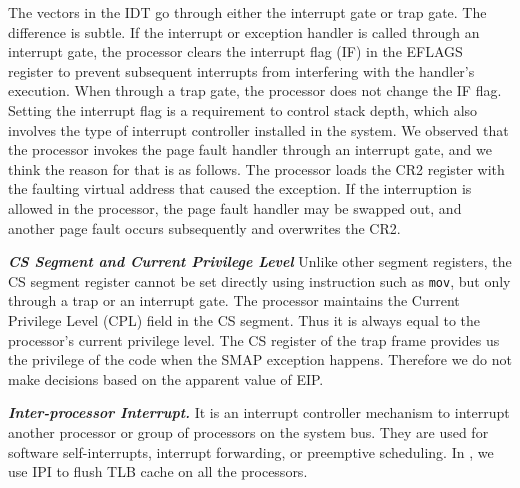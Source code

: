 The vectors in the IDT go through either the interrupt gate or trap gate. The difference is subtle. If the interrupt or exception handler is called through an interrupt gate, the processor clears the interrupt flag (IF) in the EFLAGS register to prevent subsequent interrupts from interfering with the handler's execution.  When through a trap gate, the processor does not change the IF flag. Setting the interrupt flag is a requirement to control stack depth, which also involves the type of interrupt controller installed in the system. We observed that the processor invokes the page fault handler through an interrupt gate, and we think the reason for that is as follows. The processor loads the CR2 register with the faulting virtual address that caused the exception. If the interruption is allowed in the processor, the page fault handler may be swapped out, and another page fault occurs subsequently and overwrites the CR2. 



\textbf{\textit{CS Segment and Current Privilege Level}} Unlike other segment registers, the CS segment register cannot be set directly using instruction such as \texttt{mov},  but only through a trap or an interrupt gate.  The processor maintains the Current Privilege Level (CPL) field in the CS segment. Thus it is always equal to the processor's current privilege level. The CS register of the trap frame provides us the privilege of the code when the SMAP exception happens. Therefore we do not make decisions based on the apparent value of EIP.


\textbf{\textit{Inter-processor Interrupt.}}  It is an interrupt controller mechanism to interrupt another processor or group of processors on the system bus. They are used for software self-interrupts, interrupt forwarding, or preemptive scheduling. In \name, we use IPI to flush TLB cache on all the processors.

